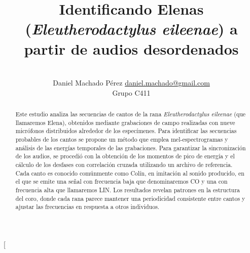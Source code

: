 \documentclass[a4paper,10pt,twocolumn]{article}
\title{Identificando Elenas (\textit{Eleutherodactylus eileenae}) a partir de audios desordenados}
\author{\\
\name Daniel Machado Pérez \email \href{mailto:daniel.machado@gmail.com}{daniel.machado@gmail.com}
	\\ \addr Grupo C411}
\begin{document}
\twocolumn[

\maketitle


\begin{abstract}


Este estudio analiza las secuencias de cantos de la 
rana \textit{Eleutherodactylus eileenae} (que llamaremos Elena), 
obtenidos mediante grabaciones de campo realizadas 
con nueve micrófonos distribuidos alrededor de los 
especímenes. Para identificar las secuencias 
probables de los cantos se propone un método que 
emplea mel-espectrogramas y análisis de las energías 
temporales de las grabaciones. Para garantizar la sincronización de 
los audios, se procedió con la obtención de
los momentos de pico de energía y el cálculo de los 
desfases con correlación cruzada utilizando un 
archivo de referencia. Cada canto es conocido comúnmente como
Colín, en imitación al sonido producido, en el que se emite
una señal con frecuencia baja que denominaremos CO y una con frecuencia
alta que llamaremos LIN. Los resultados 
revelan patrones en la estructura del coro, donde 
cada rana parece mantener una periodicidad consistente 
entre cantos y ajustar las frecuencias en respuesta a 
otros individuos.
	
	

\end{abstract}

\vspace{0.5cm}
\end{document}
